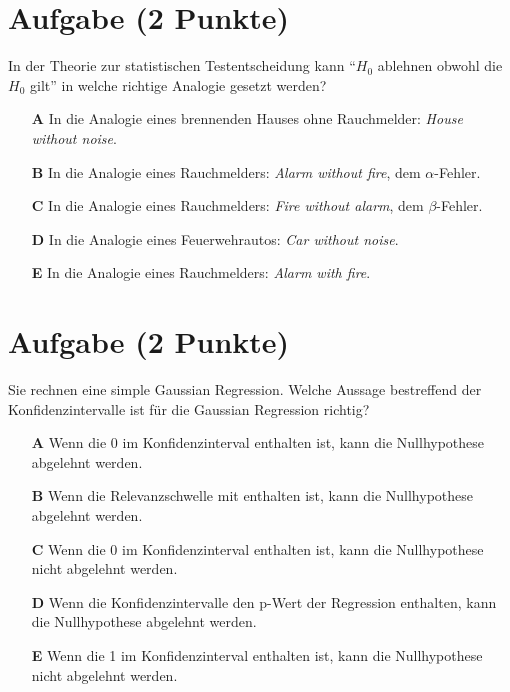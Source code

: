 \documentclass[a4paper, 9pt]{scrartcl}\usepackage[]{graphicx}\usepackage[]{xcolor}
\begin{document}
\section{Aufgabe \hfill (2 Punkte)}



In der Theorie zur statistischen Testentscheidung kann "`$H_0$ ablehnen obwohl die $H_0$ gilt"'
in welche richtige Analogie gesetzt werden?



\begin{enumerate}
\item [\textbf{A} \msquare] In die Analogie eines brennenden Hauses ohne Rauchmelder: \textit{House without noise}.
\item [\textbf{B} \msquare] In die Analogie eines Rauchmelders: \textit{Alarm without fire}, dem $\alpha$-Fehler.
\item [\textbf{C} \msquare] In die Analogie eines Rauchmelders: \textit{Fire without alarm}, dem $\beta$-Fehler.
\item [\textbf{D} \msquare] In die Analogie eines Feuerwehrautos: \textit{Car without noise}.
\item [\textbf{E} \msquare] In die Analogie eines Rauchmelders: \textit{Alarm with fire}.
\end{enumerate}

\section{Aufgabe \hfill (2 Punkte)}



Sie rechnen eine simple Gaussian Regression. Welche Aussage bestreffend der
Konfidenzintervalle ist f{\"u}r die Gaussian Regression richtig?



\begin{enumerate}
\item [\textbf{A} \msquare] Wenn die 0 im Konfidenzinterval enthalten ist, kann die Nullhypothese abgelehnt werden.
\item [\textbf{B} \msquare] Wenn die Relevanzschwelle mit enthalten ist, kann die Nullhypothese abgelehnt werden.
\item [\textbf{C} \msquare] Wenn die 0 im Konfidenzinterval enthalten ist, kann die Nullhypothese nicht abgelehnt werden.
\item [\textbf{D} \msquare] Wenn die Konfidenzintervalle den p-Wert der Regression enthalten, kann die Nullhypothese abgelehnt werden.
\item [\textbf{E} \msquare] Wenn die 1 im Konfidenzinterval enthalten ist, kann die Nullhypothese nicht abgelehnt werden.
\end{enumerate}
\end{document}
